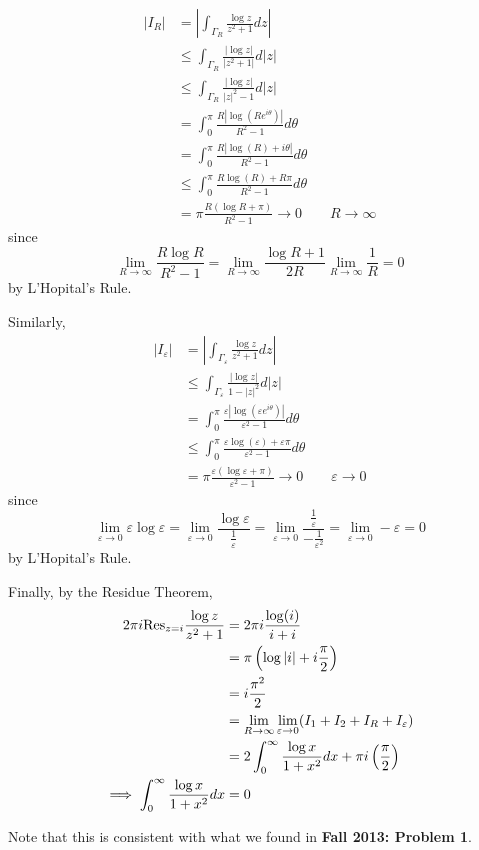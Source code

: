 \documentclass[12pt]{Qual}
\begin{document}
\begin{solution}
\begin{align*}
    |I_R|&=\left|\int_{\Gamma_R}\frac{\log z}{z^2+1}dz\right|\\
    &\le\int_{\Gamma_R}\frac{|\log z|}{|z^2+1|}d|z|\\
    &\le\int_{\Gamma_R}\frac{|\log z|}{|z|^2-1}d|z|\\
    &=\int_0^\pi\frac{R|\log(Re^{i\theta})|}{R^2-1}d\theta\\
    &=\int_0^\pi\frac{R|\log(R)+i\theta|}{R^2-1}d\theta\\
    &\le\int_0^\pi\frac{R\log(R)+R\pi}{R^2-1}d\theta\\
    &=\pi\frac{R(\log R+\pi)}{R^2-1}\to0\qquad R\to\infty
\end{align*} since $$\lim_{R\to\infty}\frac{R\log R}{R^2-1}=\lim_{R\to\infty}\frac{\log R+1}{2R}\lim_{R\to\infty}\frac{1}{R}=0$$ by L'Hopital's Rule.

Similarly, \begin{align*}
    |I_\varepsilon|&=\left|\int_{\Gamma_\varepsilon}\frac{\log z}{z^2+1}dz\right|\\
    &\le\int_{\Gamma_\varepsilon}\frac{|\log z|}{1-|z|^2}d|z|\\
    &=\int_0^\pi\frac{\varepsilon|\log(\varepsilon e^{i\theta})|}{\varepsilon^2-1}d\theta\\
    &\le\int_0^\pi\frac{\varepsilon\log(\varepsilon)+\varepsilon\pi}{\varepsilon^2-1}d\theta\\
    &=\pi\frac{\varepsilon(\log \varepsilon+\pi)}{\varepsilon^2-1}\to0\qquad \varepsilon\to0
\end{align*} since $$\lim_{\varepsilon\to0}\varepsilon\log\varepsilon=\lim_{\varepsilon\to0}\frac{\log\varepsilon}{\frac{1}{\varepsilon}}=\lim_{\varepsilon\to0}\frac{\frac{1}{\varepsilon}}{-\frac{1}{\varepsilon^2}}=\lim_{\varepsilon\to0}-\varepsilon=0$$ by L'Hopital's Rule.

Finally, by the Residue Theorem, \begin{align*}
    2\pi i\text{Res}_{z=i}\frac{\log z}{z^2+1}&=2\pi i\frac{\log(i)}{i+i}\\
    &=\pi\left(\log|i|+i\frac{\pi}{2}\right)\\
    &=i\frac{\pi^2}{2}\\
    &=\lim_{R\to\infty}\lim_{\varepsilon\to0}(I_1+I_2+I_R+I_\varepsilon)\\
    &=2\int_0^\infty\frac{\log x}{1+x^2}dx+\pi i\left(\frac{\pi}{2}\right)\\
    \implies \int_0^\infty\frac{\log x}{1+x^2}dx&=0
\end{align*}

Note that this is consistent with what we found in \textbf{Fall 2013: Problem 1}.
\end{solution}
\newpage
\end{document}
